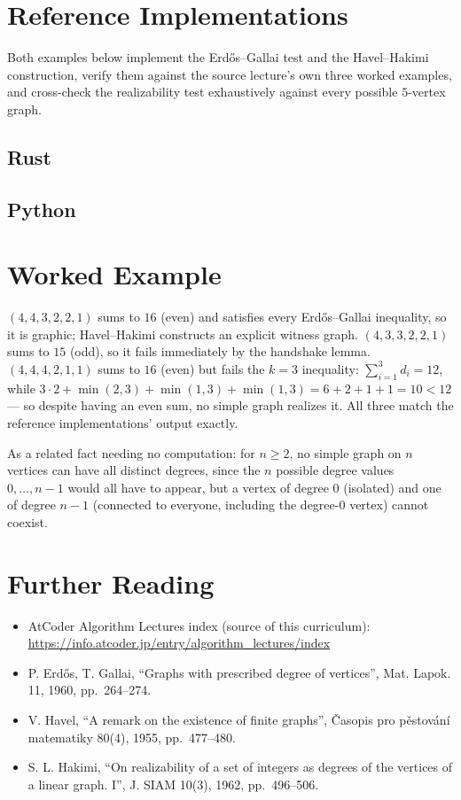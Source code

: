 \documentclass[11pt]{article}
\begin{document}
\section{Reference Implementations}
Both examples below implement the Erd\H{o}s--Gallai test and the
Havel--Hakimi construction, verify them against the source lecture's own
three worked examples, and cross-check the realizability test exhaustively
against every possible $5$-vertex graph.

\codenote
\subsection{Rust}

\subsection{Python}

\section{Worked Example}
\begin{examplebox}
$(4,4,3,2,2,1)$ sums to $16$ (even) and satisfies every Erd\H{o}s--Gallai
inequality, so it is graphic; Havel--Hakimi constructs an explicit witness
graph. $(4,3,3,2,2,1)$ sums to $15$ (odd), so it fails immediately by the
handshake lemma. $(4,4,4,2,1,1)$ sums to $16$ (even) but fails the $k=3$
inequality: $\sum_{i=1}^3 d_i = 12$, while
$3\cdot 2 + \min(2,3)+\min(1,3)+\min(1,3) = 6 + 2 + 1 + 1 = 10 < 12$ --- so
despite having an even sum, no simple graph realizes it. All three match
the reference implementations' output exactly.

As a related fact needing no computation: for $n \ge 2$, no simple graph
on $n$ vertices can have all distinct degrees, since the $n$ possible
degree values $0, \ldots, n-1$ would all have to appear, but a vertex of
degree $0$ (isolated) and one of degree $n-1$ (connected to everyone,
including the degree-$0$ vertex) cannot coexist.
\end{examplebox}

\section{Further Reading}
\begin{itemize}[leftmargin=1.5em]
  \item AtCoder Algorithm Lectures index (source of this curriculum):
        \url{https://info.atcoder.jp/entry/algorithm_lectures/index}
  \item P. Erd\H{o}s, T. Gallai, ``Graphs with prescribed degree of
        vertices'', Mat. Lapok. 11, 1960, pp.\ 264--274.
  \item V. Havel, ``A remark on the existence of finite graphs'',
        \v{C}asopis pro p\v{e}stov\'{a}n\'{i} matematiky 80(4), 1955,
        pp.\ 477--480.
  \item S. L. Hakimi, ``On realizability of a set of integers as degrees
        of the vertices of a linear graph. I'', J. SIAM 10(3), 1962,
        pp.\ 496--506.
\end{itemize}
\end{document}
